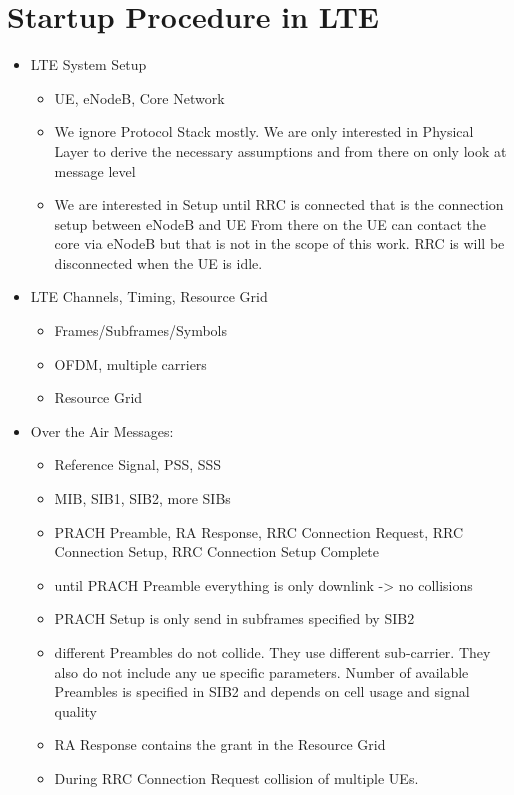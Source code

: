 \documentclass[conference]{IEEEtran}
\begin{document}
\section{Startup Procedure in LTE}
\begin{itemize}
    \item LTE System Setup
    \begin{itemize}
        \item UE, eNodeB, Core Network
        \item We ignore Protocol Stack mostly.
        We are only interested in Physical Layer to derive the necessary assumptions
        and from there on only look at message level
        \item We are interested in Setup until RRC is connected that is the connection setup between eNodeB and UE
        From there on the UE can contact the core via eNodeB but that is not in the scope of this work.
        RRC is will be disconnected when the UE is idle.
    \end{itemize}
    \item LTE Channels, Timing, Resource Grid
    \begin{itemize}
        \item Frames/Subframes/Symbols
        \item OFDM, multiple carriers
        \item Resource Grid
    \end{itemize}
    \item Over the Air Messages:
    \begin{itemize}
        \item Reference Signal, PSS, SSS
        \item MIB, SIB1, SIB2, more SIBs
        \item PRACH Preamble, RA Response, RRC Connection Request, RRC Connection Setup, RRC Connection Setup Complete
        \item until PRACH Preamble everything is only downlink -> no collisions
        \item PRACH Setup is only send in subframes specified by SIB2
        \item different Preambles do not collide.
        They use different sub-carrier.
        They also do not include any ue specific parameters.
        Number of available Preambles is specified in SIB2 and depends on cell usage and signal quality
        \item RA Response contains the grant in the Resource Grid
        \item During RRC Connection Request collision of multiple UEs.

\end{itemize}
\end{itemize}
\end{document}
